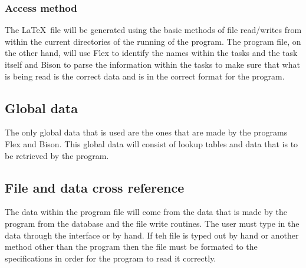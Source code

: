                \subsubsection{Access method}
                 The \LaTeX\ file will be generated using the basic methods of
file read/writes from within the current directories of the running of the
program. The program file, on the other hand, will use Flex to identify the
names within the tasks and the task itself and Bison to parse the
information within the tasks to make sure that what is being read is the correct
data and is in the correct format for the program.

                \subsection{Global data}
                 The only global data that is used are the ones that are made by
the programs Flex and Bison. This global data will consist of lookup tables and
data that is to be retrieved by the program.


                \subsection{File and data cross reference}
                  The data within the program file will come from the data that
is made by the program from the database and the file write routines. The user
must type in the data through the interface or by hand. If teh file is typed
out by hand or another method other than the program then the file must
be formated to the specifications in order for the program to read it correctly.

